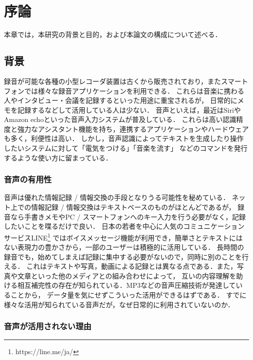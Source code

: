\chapter{序論}
\label{chap:introduction}

本章では，本研究の背景と目的，および本論文の構成について述べる．

\newpage

\section{背景}

録音が可能な各種の小型レコーダ装置は古くから販売されており，またスマートフォンでは様々な録音アプリケーションを利用できる．
これらは音楽に携わる人やインタビュー・会議を記録するといった用途に重宝されるが，
日常的にメモを記録するなどして活用している人は少ない．
音声といえば，最近はSiriやAmazon echoといった音声入力システムが普及している．
これらは高い認識精度と強力なアシスタント機能を持ち，連携するアプリケーションやハードウェアも多く，利便性は高い．
しかし，音声認識によってテキストを生成したり操作したいシステムに対して「電気をつける」「音楽を流す」
などのコマンドを発行するような使い方に留まっている．


\subsection{音声の有用性}

音声は優れた情報記録 / 情報交換の手段となりうる可能性を秘めている．
ネット上での情報記録 / 情報交換はテキストベースのものがほとんどであるが，
録音なら手書きメモやPC / スマートフォンへのキー入力を行う必要がなく，記録したいことを喋るだけで良い．
日本の若者を中心に人気のコミュニケーションサービスLINE\footnote{\textsf{https://line.me/ja/}}
ではボイスメッセージ機能が利用でき，簡単さとテキストにはない表現力の豊かさから，一部のユーザーは積極的に活用している．
長時間の録音でも，始めてしまえば記録に集中する必要がないので，同時に別のことを行える．
これはテキストや写真，動画による記録とは異なる点である．また，写真や文章といった他のメディアとの組み合わせによって，
互いの内容理解を助ける相互補完性の存在が知られている\cite{Nakakura}．MP3などの音声圧縮技術が発達していることから，
データ量を気にせずこういった活用ができるはずである．
すでに様々な活用が知られている音声だが，なぜ日常的に利用されていないのか．


\subsection{音声が活用されない理由}

